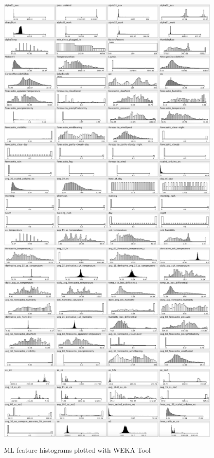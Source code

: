 \begin{figure}
 	\includegraphics[width=\textwidth-1cm]{weka/features1}  
	\includegraphics[width=\textwidth-1cm]{weka/features2}  
	\includegraphics[width=\textwidth-1cm]{weka/features3}  
	\includegraphics[width=\textwidth-1cm]{weka/features4}                 
         \caption{ML feature histograms plotted with WEKA Tool}
 	 \label{fig:weka_features}
\end{figure}

